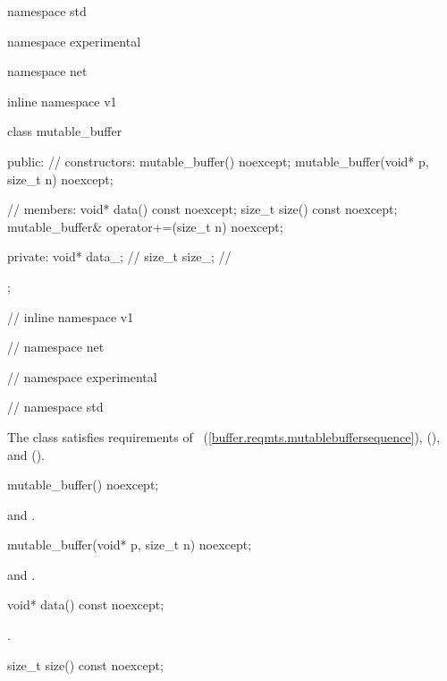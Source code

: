 %
\begin{codeblock}
namespace std {
namespace experimental {
namespace net {
inline namespace v1 {

  class mutable_buffer
  {
  public:
    // constructors:
    mutable_buffer() noexcept;
    mutable_buffer(void* p, size_t n) noexcept;

    // members:
    void* data() const noexcept;
    size_t size() const noexcept;
    mutable_buffer& operator+=(size_t n) noexcept;

  private:
    void* data_; // \expos
    size_t size_; // \expos
  };

} // inline namespace v1
} // namespace net
} // namespace experimental
} // namespace std
\end{codeblock}

\pnum
The  class satisfies requirements of ~(\ref{buffer.reqmts.mutablebuffersequence}),  (), and  ().

%
\begin{itemdecl}
mutable_buffer() noexcept;
\end{itemdecl}

\begin{itemdescr}
\pnum
\postconditions {} and .
\end{itemdescr}

%
\begin{itemdecl}
mutable_buffer(void* p, size_t n) noexcept;
\end{itemdecl}

\begin{itemdescr}
\pnum
\postconditions {} and .
\end{itemdescr}

%
\begin{itemdecl}
void* data() const noexcept;
\end{itemdecl}

\begin{itemdescr}
\pnum
\returns {}.
\end{itemdescr}

%
\begin{itemdecl}
size_t size() const noexcept;
\end{itemdecl}

